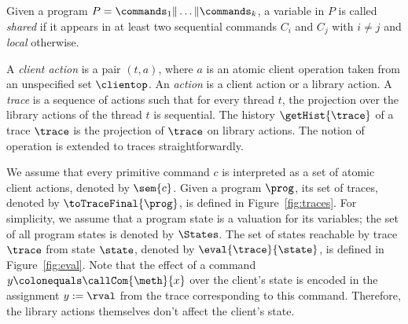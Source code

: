 Given a program $P=\commands_1 \| \dots \| \commands_k$, a variable in $P$ is called \emph{shared} if it appears in at least two sequential commands $C_i$ and $C_j$ with $i\neq j$ and \emph{local} otherwise.


A \emph{client action} is a pair $(t,a)$, where $a$ is an atomic client operation taken from an unspecified set $\clientop$. An \emph{action} is a client action or a library action.
A \emph{trace} is a sequence of actions such that 
for every thread $t$, the projection over the library actions of the thread $t$ is sequential.
The history $\getHist{\trace}$ of a trace $\trace$ is the projection of $\trace$ on library actions.
The notion of operation is extended to traces straightforwardly. 

We assume that every primitive command $c$ is interpreted as a set of atomic client actions, denoted by $\sem{c}$. 
Given a program $\prog$, its set of traces, denoted by $\toTraceFinal{\prog}$, is defined in Figure~\ref{fig:traces}.
For simplicity, we assume that a program state is a valuation for its variables; the set of all program states is denoted by $\States$.
The set of states reachable by trace $\trace$ from state $\state$, denoted by $\eval{\trace}{\state}$, is defined in Figure~\ref{fig:eval}. 
Note that the effect of a command $y \colonequals \callCom{\meth}{x}$ over the client's state is encoded in the assignment $y:=\rval$
from the trace corresponding to this command. Therefore, the library actions themselves don't affect the client's state.

